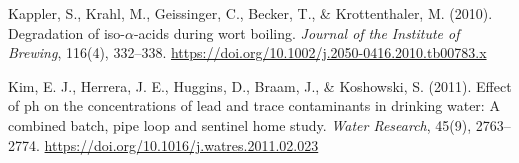\documentclass[12pt,]{article}
\begin{document}
Kappler, S., Krahl, M., Geissinger, C., Becker, T., \& Krottenthaler, M.
(2010). Degradation of iso-\(\alpha\)-acids during wort boiling.
\emph{Journal of the Institute of Brewing}, 116(4), 332--338.
\url{https://doi.org/10.1002/j.2050-0416.2010.tb00783.x}

Kim, E. J., Herrera, J. E., Huggins, D., Braam, J., \& Koshowski, S.
(2011). Effect of ph on the concentrations of lead and trace
contaminants in drinking water: A combined batch, pipe loop and sentinel
home study. \emph{Water Research}, 45(9), 2763--2774.
\url{https://doi.org/10.1016/j.watres.2011.02.023}
\end{document}
